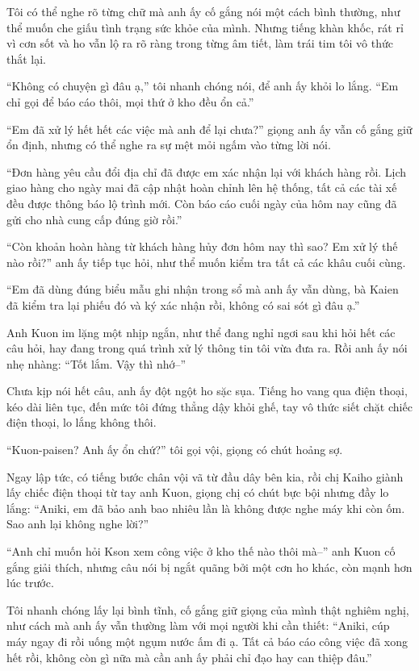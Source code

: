 \documentclass[../main.tex]{subfiles}
\begin{document}
Tôi có thể nghe rõ từng chữ mà anh ấy cố gắng nói một cách bình thường, như thể muốn che giấu tình trạng sức khỏe của mình. Nhưng tiếng khàn khốc, rát rỉ vì cơn sốt và ho vẫn lộ ra rõ ràng trong từng âm tiết, làm trái tim tôi vô thức thắt lại.

``Không có chuyện gì đâu ạ,'' tôi nhanh chóng nói, để anh ấy khỏi lo lắng. ``Em chỉ gọi để báo cáo thôi, mọi thứ ở kho đều ổn cả.''

``Em đã xử lý hết hết các việc mà anh để lại chưa?'' giọng anh ấy vẫn cố gắng giữ ổn định, nhưng có thể nghe ra sự mệt mỏi ngấm vào từng lời nói.

``Đơn hàng yêu cầu đổi địa chỉ đã được em xác nhận lại với khách hàng rồi. Lịch giao hàng cho ngày mai đã cập nhật hoàn chỉnh lên hệ thống, tất cả các tài xế đều được thông báo lộ trình mới. Còn báo cáo cuối ngày của hôm nay cũng đã gửi cho nhà cung cấp đúng giờ rồi.''

``Còn khoản hoàn hàng từ khách hàng hủy đơn hôm nay thì sao? Em xử lý thế nào rồi?'' anh ấy tiếp tục hỏi, như thể muốn kiểm tra tất cả các khâu cuối cùng.

``Em đã dùng đúng biểu mẫu ghi nhận trong sổ mà anh ấy vẫn dùng, bà Kaien đã kiểm tra lại phiếu đó và ký xác nhận rồi, không có sai sót gì đâu ạ.''

Anh Kuon im lặng một nhịp ngắn, như thể đang nghỉ ngơi sau khi hỏi hết các câu hỏi, hay đang trong quá trình xử lý thông tin tôi vừa đưa ra. Rồi anh ấy nói nhẹ nhàng: ``Tốt lắm. Vậy thì nhớ--''

Chưa kịp nói hết câu, anh ấy đột ngột ho sặc sụa. Tiếng ho vang qua điện thoại, kéo dài liên tục, đến mức tôi đứng thẳng dậy khỏi ghế, tay vô thức siết chặt chiếc điện thoại, lo lắng không thôi.

``Kuon-paisen? Anh ấy ổn chứ?'' tôi gọi vội, giọng có chút hoảng sợ.

Ngay lập tức, có tiếng bước chân vội vã từ đầu dây bên kia, rồi chị Kaiho giành lấy chiếc điện thoại từ tay anh Kuon, giọng chị có chút bực bội nhưng đầy lo lắng: ``Aniki, em đã bảo anh bao nhiêu lần là không được nghe máy khi còn ốm. Sao anh lại không nghe lời?''

``Anh chỉ muốn hỏi Kson xem công việc ở kho thế nào thôi mà--'' anh Kuon cố gắng giải thích, nhưng câu nói bị ngắt quãng bởi một cơn ho khác, còn mạnh hơn lúc trước.

Tôi nhanh chóng lấy lại bình tĩnh, cố gắng giữ giọng của mình thật nghiêm nghị, như cách mà anh ấy vẫn thường làm với mọi người khi cần thiết: ``Aniki, cúp máy ngay đi rồi uống một ngụm nước ấm đi ạ. Tất cả báo cáo công việc đã xong hết rồi, không còn gì nữa mà cần anh ấy phải chỉ đạo hay can thiệp đâu.''
\end{document}
